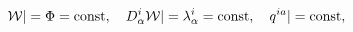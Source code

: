 \begin{equation}\label{3}
{\cal W}|=\Phi={\rm const}, \quad D^{i}_{\alpha}{\cal
W}|=\lambda^{i}_{\alpha}={\rm const},\quad q^{ia}|={\rm const},
\end{equation}

